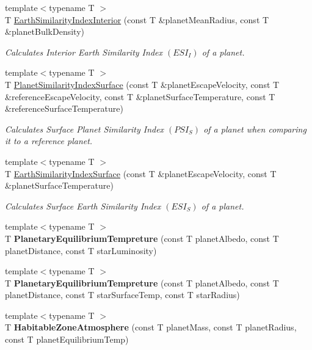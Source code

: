 \begin{DoxyCompactItemize}
{\footnotesize template$<$typename T $>$ }\\T \mbox{\hyperlink{group___e_g_x_phys-_planet_criteria_ga699bcc2f17b8855eaa856595d8032f61}{Earth\+Similarity\+Index\+Interior}} (const T \&planet\+Mean\+Radius, const T \&planet\+Bulk\+Density)
\begin{DoxyCompactList}\small\item\em Calculates Interior Earth Similarity Index $(ESI_I)$ of a planet. \end{DoxyCompactList}\item 
{\footnotesize template$<$typename T $>$ }\\T \mbox{\hyperlink{group___e_g_x_phys-_planet_criteria_gae0c7dce2779d66b0560ca388a34ddc39}{Planet\+Similarity\+Index\+Surface}} (const T \&planet\+Escape\+Velocity, const T \&reference\+Escape\+Velocity, const T \&planet\+Surface\+Temperature, const T \&reference\+Surface\+Temperature)
\begin{DoxyCompactList}\small\item\em Calculates Surface Planet Similarity Index $(PSI_S)$ of a planet when comparing it to a reference planet. \end{DoxyCompactList}\item 
{\footnotesize template$<$typename T $>$ }\\T \mbox{\hyperlink{group___e_g_x_phys-_planet_criteria_ga1df772b0ed354ca7f7e4a7a4af072325}{Earth\+Similarity\+Index\+Surface}} (const T \&planet\+Escape\+Velocity, const T \&planet\+Surface\+Temperature)
\begin{DoxyCompactList}\small\item\em Calculates Surface Earth Similarity Index $(ESI_S)$ of a planet. \end{DoxyCompactList}\item 
{\footnotesize template$<$typename T $>$ }\\T {\bfseries Planetary\+Equilibrium\+Tempreture} (const T planet\+Albedo, const T planet\+Distance, const T star\+Luminosity)
\item 
{\footnotesize template$<$typename T $>$ }\\T {\bfseries Planetary\+Equilibrium\+Tempreture} (const T planet\+Albedo, const T planet\+Distance, const T star\+Surface\+Temp, const T star\+Radius)
\item 
{\footnotesize template$<$typename T $>$ }\\T {\bfseries Habitable\+Zone\+Atmosphere} (const T planet\+Mass, const T planet\+Radius, const T planet\+Equilibrium\+Temp)
\item 

\end{DoxyCompactItemize}

